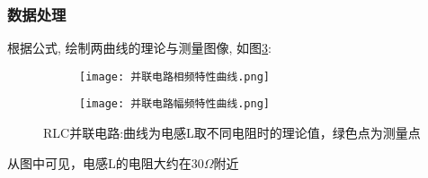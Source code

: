 \documentclass[11pt]{article}
\begin{document}
\subsubsection{数据处理}
根据公式, 绘制两曲线的理论与测量图像, 如图\ref{fig:parallel}:

\begin{figure}[htbp]
	\centering
	\begin{subfigure}[t]{0.45\textwidth}  %
		\centering
		\texttt{[image: 并联电路相频特性曲线.png]}  %
		\label{fig:parallel phase}
	\end{subfigure}
	\begin{subfigure}[t]{0.45\textwidth}  %
		\centering
		\texttt{[image: 并联电路幅频特性曲线.png]}  %
		\label{fig:parallel amplitutde}
	\end{subfigure}
	\caption{RLC并联电路:曲线为电感L取不同电阻时的理论值，绿色点为测量点}
	\label{fig:parallel}
\end{figure}

从图中可见，电感L的电阻大约在30$\Omega$附近
\end{document}
